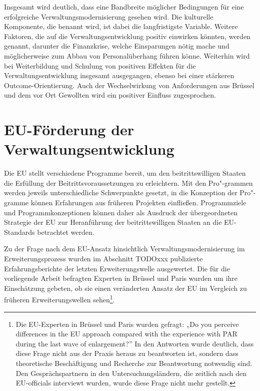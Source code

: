 Insgesamt wird deutlich, dass eine Bandbreite möglicher Bedingungen für eine erfolgreiche Verwaltungsmodernisierung gesehen wird. Die kulturelle Komponente, die benannt wird, ist dabei die langfristigste Variable. Weitere Faktoren, die auf die Verwaltungsentwicklung positiv einwirken könnten, werden genannt, darunter die Finanzkrise, welche Einsparungen nötig mache und möglicherweise zum Abbau von Personalüberhang führen könne. Weiterhin wird bei Weiterbildung und Schulung von positiven Effekten für die Verwaltungsentwicklung insgesamt ausgegangen, ebenso bei einer stärkeren Outcome-Orientierung. Auch der Wechselwirkung von Anforderungen aus Brüssel und dem vor Ort Gewollten wird ein positiver Einfluss zugesprochen.


\section{EU-Förderung der Verwaltungsentwicklung }
Die EU stellt verschiedene Programme bereit, um den beitrittswilligen Staaten die Erfüllung der Beitrittsvoraussetzungen zu erleichtern. Mit den Pro"-grammen werden jeweils unterschiedliche Schwerpunkte gesetzt, in die Konzeption der Pro"-gramme können Erfahrungen aus früheren Projekten einfließen. Programmziele und Programmkonzeptionen können daher als Ausdruck der übergeordneten Strategie der EU zur Heranführung der beitrittswilligen Staaten an die EU-Standards betrachtet werden.\par
Zu der Frage nach dem EU-Ansatz hinsichtlich Verwaltungsmodernisierung im Erweiterungsprozess wurden im Abschnitt TODOxxx publizierte Erfahrungsberichte der letzten Erweiterungswelle ausgewertet. Die für die vorliegende Arbeit befragten Experten in Brüssel und Paris wurden um ihre Einschätzung gebeten, ob sie einen veränderten Ansatz der EU im Vergleich zu früheren Erweiterungswellen sehen\footnote{Die EU-Experten in Brüssel und Paris wurden gefragt: „Do you perceive differences in the EU approach compared with the experience with PAR during the last wave of enlargement?” In den Antworten wurde deutlich, dass diese Frage nicht aus der Praxis heraus zu beantworten ist, sondern dass theoretische Beschäftigung und Recherche zur Beantwortung notwendig sind. Den Gesprächspartnern in den Untersuchungsländern, die zeitlich nach den EU-officials interviewt wurden, wurde diese Frage nicht mehr gestellt.}.


